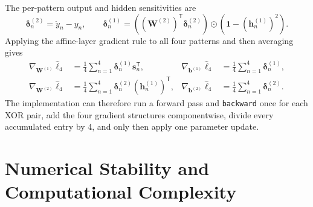 \documentclass{article}
\begin{document}
The per-pattern output and hidden sensitivities are
\[
  \boldsymbol{\delta}_n^{(2)}
  =
  \ddot{y}_n-y_n,
  \qquad
  \boldsymbol{\delta}_n^{(1)}
  =
  \left(
    (\mathbf{W}^{(2)})^\mathsf{T}
    \boldsymbol{\delta}_n^{(2)}
  \right)
  \odot
  \left(
    \mathbf{1}-(\mathbf{h}_n^{(1)})^2
  \right).
\]
Applying the affine-layer gradient rule to all four patterns and then
averaging gives
\[
  \begin{aligned}
    \nabla_{\mathbf{W}^{(1)}}\widehat{\ell}_4
    &=
    \frac{1}{4}
    \sum_{n=1}^{4}
    \boldsymbol{\delta}_n^{(1)}\mathbf{s}_n^\mathsf{T},&
    \nabla_{\mathbf{b}^{(1)}}\widehat{\ell}_4
    &=
    \frac{1}{4}
    \sum_{n=1}^{4}
    \boldsymbol{\delta}_n^{(1)},\\
    \nabla_{\mathbf{W}^{(2)}}\widehat{\ell}_4
    &=
    \frac{1}{4}
    \sum_{n=1}^{4}
    \boldsymbol{\delta}_n^{(2)}
    (\mathbf{h}_n^{(1)})^\mathsf{T},&
    \nabla_{\mathbf{b}^{(2)}}\widehat{\ell}_4
    &=
    \frac{1}{4}
    \sum_{n=1}^{4}
    \boldsymbol{\delta}_n^{(2)}.
  \end{aligned}
\]
The implementation can therefore run a forward pass and
\texttt{backward} once for each XOR pair, add the four gradient
structures componentwise, divide every accumulated entry by \(4\), and
only then apply one parameter update.

\section{Numerical Stability and Computational Complexity}
\label{sec:numerical-stability}

%
%
%
%
%
%
%
\end{document}
